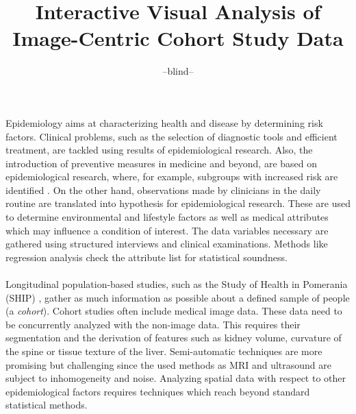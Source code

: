 \documentclass[journal]{style/vgtc} 			          %
\title{Interactive Visual Analysis of Image-Centric Cohort Study Data}
\author{--blind--}
\begin{document}


\maketitle

Epidemiology aims at characterizing health and disease by determining risk factors.
%
Clinical problems, such as the selection of diagnostic tools and efficient treatment, are tackled using results of epidemiological research.
%
Also, the introduction of preventive measures in medicine and beyond, are based on epidemiological research, where, for example, subgroups with increased risk are identified \cite{Fletcher2012}.
%
On the other hand, observations made by clinicians in the daily routine are translated into hypothesis for epidemiological research.
%
These are used to determine environmental and lifestyle factors as well as medical attributes which may influence a condition of interest.
%
The data variables necessary are gathered using structured interviews and clinical examinations.
%
Methods like regression analysis check the attribute list for statistical soundness.
%
\\\\
Longitudinal population-based studies, such as the Study of Health in Pomerania (SHIP) \cite{Volzke2011}, gather as much information as possible about a defined sample of people (a \emph{cohort}).
%
%
Cohort studies often include medical image data.
%
These data need to be concurrently analyzed with the non-image data. This requires their segmentation and the derivation of features such as kidney volume, curvature of the spine or tissue texture of the liver.
%
%
Semi-automatic techniques are more promising but challenging since the used methods as MRI and ultrasound are subject to inhomogeneity and noise.
%
Analyzing spatial data with respect to other epidemiological factors requires techniques which reach beyond standard statistical methods.
\end{document}
